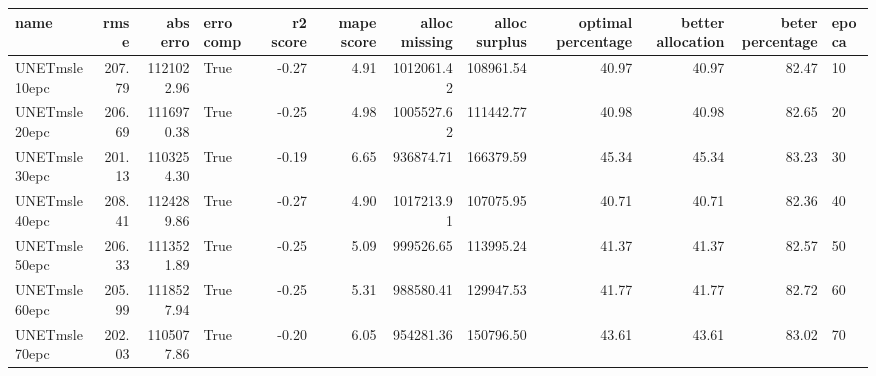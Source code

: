 \begin{tabular}{lrrlrrrrrrrl}
\toprule
name & rmse & abs erro & erro comp & r2 score & mape score & alloc missing & alloc surplus & optimal percentage & better allocation & beter percentage & epoca \\
\midrule
UNETmsle10epc & 207.79 & 1121022.96 & True & -0.27 & 4.91 & 1012061.42 & 108961.54 & 40.97 & 40.97 & 82.47 & 10 \\
UNETmsle20epc & 206.69 & 1116970.38 & True & -0.25 & 4.98 & 1005527.62 & 111442.77 & 40.98 & 40.98 & 82.65 & 20 \\
UNETmsle30epc & 201.13 & 1103254.30 & True & -0.19 & 6.65 & 936874.71 & 166379.59 & 45.34 & 45.34 & 83.23 & 30 \\
UNETmsle40epc & 208.41 & 1124289.86 & True & -0.27 & 4.90 & 1017213.91 & 107075.95 & 40.71 & 40.71 & 82.36 & 40 \\
UNETmsle50epc & 206.33 & 1113521.89 & True & -0.25 & 5.09 & 999526.65 & 113995.24 & 41.37 & 41.37 & 82.57 & 50 \\
UNETmsle60epc & 205.99 & 1118527.94 & True & -0.25 & 5.31 & 988580.41 & 129947.53 & 41.77 & 41.77 & 82.72 & 60 \\
UNETmsle70epc & 202.03 & 1105077.86 & True & -0.20 & 6.05 & 954281.36 & 150796.50 & 43.61 & 43.61 & 83.02 & 70 \\
\bottomrule
\end{tabular}
